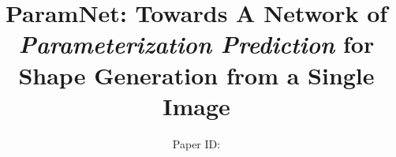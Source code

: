 

\title[ParamNet: Towards A Network of \emph{Parameterization
	Prediction} for Shape Generation from a Single Image]%
      {ParamNet: Towards A Network of \emph{Parameterization
      	Prediction} for Shape Generation from a Single Image}

\author[Paper ID:]
{Paper ID:}

%





\maketitle
 





%





